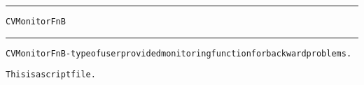 \begin{samepage}
\hrule
\begin{center}
{\large \verb!CVMonitorFnB!}
\label{p:CVMonitorFnB}
\end{center}
\hrule\vspace{0.1in}



\begin{alltt}
CVMonitorFnB - type of user provided monitoring function for backward problems.
\end{alltt}

\end{samepage}



\begin{samepage}


\begin{alltt}
This is a script file. 
\end{alltt}

\end{samepage}



